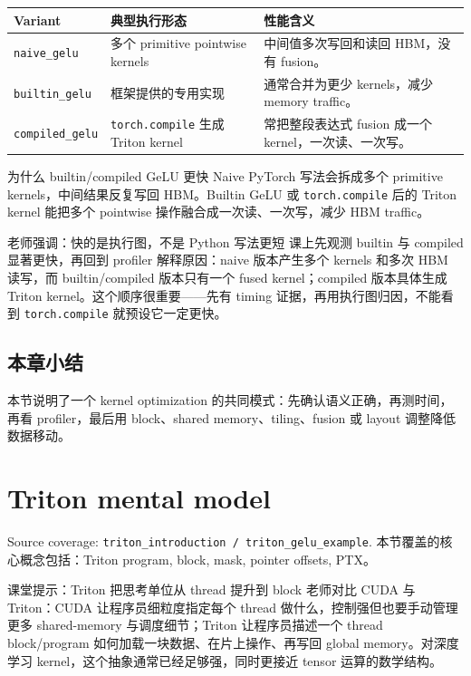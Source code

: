 \documentclass[a4paper]{article}
\begin{document}
\begin{longtable}{p{}p{}p{}}
\toprule
\textbf{Variant} & \textbf{典型执行形态} & \textbf{性能含义} \\
\midrule
\texttt{naive\_gelu} & 多个 primitive pointwise kernels & 中间值多次写回和读回 HBM，没有 fusion。 \\
\texttt{builtin\_gelu} & 框架提供的专用实现 & 通常合并为更少 kernels，减少 memory traffic。 \\
\texttt{compiled\_gelu} & \texttt{torch.compile} 生成 Triton kernel & 常把整段表达式 fusion 成一个 kernel，一次读、一次写。 \\
\bottomrule
\end{longtable}
\begin{importantbox}{为什么 builtin/compiled GeLU 更快}
Naive PyTorch 写法会拆成多个 primitive kernels，中间结果反复写回 HBM。Builtin GeLU 或 \texttt{torch.compile} 后的 Triton kernel 能把多个 pointwise 操作融合成一次读、一次写，减少 HBM traffic。
\end{importantbox}

\begin{knowledgebox}{老师强调：快的是执行图，不是 Python 写法更短}
课上先观测 builtin 与 compiled 显著更快，再回到 profiler 解释原因：naive 版本产生多个 kernels 和多次 HBM 读写，而 builtin/compiled 版本只有一个 fused kernel；compiled 版本具体生成 Triton kernel。这个顺序很重要——先有 timing 证据，再用执行图归因，不能看到 \texttt{torch.compile} 就预设它一定更快。
\end{knowledgebox}
\subsection{本章小结}
本节说明了一个 kernel optimization 的共同模式：先确认语义正确，再测时间，再看 profiler，最后用 block、shared memory、tiling、fusion 或 layout 调整降低数据移动。

\section{Triton mental model}

Source coverage: \texttt{triton\_introduction / triton\_gelu\_example}. 本节覆盖的核心概念包括：Triton program, block, mask, pointer offsets, PTX。

\begin{knowledgebox}{课堂提示：Triton 把思考单位从 thread 提升到 block}
老师对比 CUDA 与 Triton：CUDA 让程序员细粒度指定每个 thread 做什么，控制强但也要手动管理更多 shared-memory 与调度细节；Triton 让程序员描述一个 thread block/program 如何加载一块数据、在片上操作、再写回 global memory。对深度学习 kernel，这个抽象通常已经足够强，同时更接近 tensor 运算的数学结构。
\end{knowledgebox}
\end{document}

